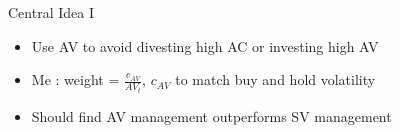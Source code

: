\documentclass{beamer}
\begin{document}
\begin{frame}{Central Idea I}
	\begin{itemize}[<+->]
		\item Use AV to avoid divesting high AC or investing high AV
		\item Me : weight = $\frac{c_{AV}}{AV_{t}}$, $c_{AV}$ to match buy and hold volatility
		\item Should find AV management outperforms SV management
	\end{itemize}
\end{frame}
\end{document}

